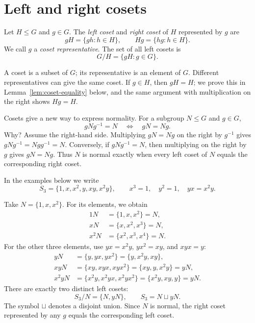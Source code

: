 \documentclass[reqno,11pt]{amsart}
\begin{document}
\makelecturetitle


\section{Left and right cosets}

\begin{define}
Let $H\leq G$ and $g\in G$. The \emph{left coset} and \emph{right coset}
of $H$ represented by $g$ are
\begin{equation}
  gH=\{gh:h\in H\},\qquad Hg=\{hg:h\in H\}.
\end{equation}
We call $g$ a \emph{coset representative}. The set of all left cosets is
\begin{equation}
  G/H=\{gH:g\in G\}.
\end{equation}
\end{define}

A coset is a subset of $G$; its representative is an element of $G$.
Different representatives can give the same coset. If $g\in H$, then
$gH=H$; we prove this in Lemma~\ref{lem:coset-equality} below, and the
same argument with multiplication on the right shows $Hg=H$.

Cosets give a new way to express normality. For a subgroup $N\leq G$ and
$g\in G$,
\begin{equation}
	gNg^{-1}=N\quad\Longleftrightarrow\quad gN=Ng.
\end{equation}
Why? Assume the right-hand side. Multiplying $gN=Ng$ on the right by
$g^{-1}$ gives $gNg^{-1}=Ngg^{-1}=N$. Conversely, if $gNg^{-1}=N$, then
multiplying on the right by $g$ gives $gN=Ng$. Thus $N$ is normal exactly
when every left coset of $N$ equals the corresponding right coset.

In the examples below we write
\[
  S_3=\{1,x,x^2,y,xy,x^2y\},\qquad
  x^3=1,\quad y^2=1,\quad yx=x^2y.
\]

\begin{example}
Take $N=\{1,x,x^2\}$. For its elements, we obtain
\begin{align*}
  1N&=\{1,x,x^2\}=N,\\
  xN&=\{x,x^2,x^3\}=N,\\
  x^2N&=\{x^2,x^3,x^4\}=N.
\end{align*}
For the other three elements, use $yx=x^2y$, $yx^2=xy$, and $xyx=y$:
\begin{align*}
  yN&=\{y,yx,yx^2\}=\{y,x^2y,xy\},\\
  xyN&=\{xy,xyx,xyx^2\}=\{xy,y,x^2y\}=yN,\\
  x^2yN&=\{x^2y,x^2yx,x^2yx^2\}=\{x^2y,xy,y\}=yN.
\end{align*}
There are exactly two distinct left cosets:
\[
  S_3/N=\{N,yN\},\qquad S_3=N\sqcup yN.
\]
The symbol $\sqcup$ denotes a disjoint union. Since $N$ is normal, the
right coset represented by any $g$ equals the corresponding left coset.
\end{example}
\end{document}
